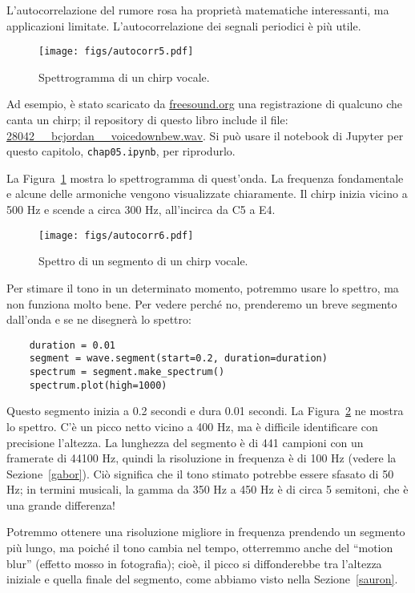 \documentclass[12pt,a4paper]{book}
\begin{document}
L'autocorrelazione del rumore rosa ha proprietà matematiche interessanti, ma applicazioni limitate. L'autocorrelazione dei segnali periodici è più utile.

\begin{figure} 

\centerline{\texttt{[image: figs/autocorr5.pdf]}} \caption{Spettrogramma di un chirp vocale.} \label{fig.autocorr5} \end{figure} 

Ad esempio, è stato scaricato da \url{freesound.org} una registrazione di qualcuno che canta un chirp; il repository di questo libro include il file: \url{28042__bcjordan__voicedownbew.wav}. Si può usare il notebook di Jupyter per questo capitolo, {\tt chap05.ipynb}, per riprodurlo.

La Figura~\ref{fig.autocorr5} mostra lo spettrogramma di quest'onda. La frequenza fondamentale e alcune delle armoniche vengono visualizzate chiaramente. Il chirp inizia vicino a 500 Hz e scende a circa 300 Hz, all'incirca da C5 a E4.

\begin{figure} 

\centerline{\texttt{[image: figs/autocorr6.pdf]}} \caption{Spettro di un segmento di un chirp vocale.} \label{fig.autocorr6} \end{figure} 

Per stimare il tono in un determinato momento, potremmo usare lo spettro, ma non funziona molto bene. Per vedere perché no, prenderemo un breve segmento dall'onda e se ne disegnerà lo spettro:

\begin{verbatim} 
    duration = 0.01
    segment = wave.segment(start=0.2, duration=duration)
    spectrum = segment.make_spectrum()
    spectrum.plot(high=1000)
 \end{verbatim} 

Questo segmento inizia a 0.2 secondi e dura 0.01 secondi. La Figura~\ref{fig.autocorr6} ne mostra lo spettro. C'è un picco netto vicino a 400 Hz, ma è difficile identificare con precisione l'altezza. La lunghezza del segmento è di 441 campioni con un framerate di 44100 Hz, quindi la risoluzione in frequenza è di 100 Hz (vedere la Sezione~\ref{gabor}). Ciò significa che il tono stimato potrebbe essere sfasato di 50 Hz; in termini musicali, la gamma da 350 Hz a 450 Hz è di circa 5 semitoni, che è una grande differenza!

Potremmo ottenere una risoluzione migliore in frequenza prendendo un segmento più lungo, ma poiché il tono cambia nel tempo, otterremmo anche del ``motion blur'' (effetto mosso in fotografia); cioè, il picco si diffonderebbe tra l'altezza iniziale e quella finale del segmento, come abbiamo visto nella Sezione~\ref{sauron}.
\end{document}

